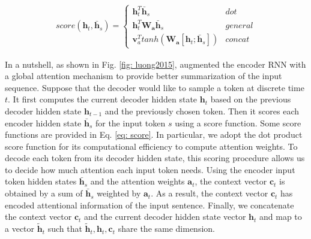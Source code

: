 \small
\begin{align}
    score(\bm{h}_t, \bm{\bar h}_s) =
  \begin{cases}
        \bm{h}_t^T \bm{\bar h}_s & dot \\
        \bm{h}_t^T \bm{W_a} \bm{\bar h}_s & general \\
        \bm{v}_a^T tanh(\bm{W_a} [\bm{h}_t;\bm{\bar h}_s]) & concat 
  \end{cases}
  \label{eq: score}
\end{align}
\normalsize

In a nutshell, as shown in Fig. \ref{fig: luong2015}, \cite{luong2015effective} augmented the encoder RNN with a global attention mechanism to provide better summarization of the input sequence. Suppose that the decoder would like to sample a token at discrete time $t$. It first computes the current decoder hidden state $\bm{h}_t$ based on the previous decoder hidden state $\bm{h}_{t-1}$ and the previously chosen token. Then it scores each encoder hidden state $\bm{\bar h}_s$ for the input token $s$ using a score function. Some score functions are provided in Eq. \ref{eq: score}. In particular, we adopt the dot product score function for its computational efficiency to compute attention weights. To decode each token from its decoder hidden state, this scoring procedure allows us to decide how much attention each input token needs. Using the encoder input token hidden states $\bm{\bar h}_s$ and the attention weights $\bm{a}_t$, the context vector $\bm{c}_t$ is obtained by a sum of $\bm{\bar h}_s$ weighted by $\bm{a}_t$. As a result, the context vector $\bm{c}_t$ has encoded attentional information of the input sentence. Finally, we concatenate the context vector $\bm{c}_t$ and the current decoder hidden state vector $\bm{h}_t$ and map to a vector $\bm{\tilde h}_t$ such that $\bm{\tilde h}_t, \bm{h}_t, \bm{c}_t$ share the same dimension.


